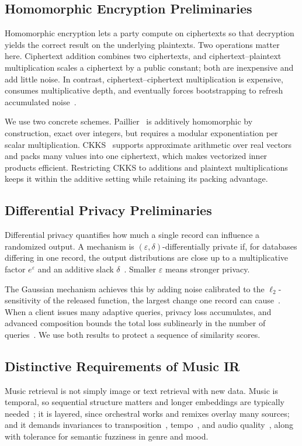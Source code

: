 \documentclass[sigconf,nonacm]{acmart}
\begin{document}
\subsection{Homomorphic Encryption Preliminaries}
Homomorphic encryption lets a party compute on ciphertexts so that decryption yields the correct result on the underlying plaintexts. Two operations matter here. Ciphertext addition combines two ciphertexts, and ciphertext--plaintext multiplication scales a ciphertext by a public constant; both are inexpensive and add little noise. In contrast, ciphertext--ciphertext multiplication is expensive, consumes multiplicative depth, and eventually forces bootstrapping to refresh accumulated noise~\cite{ckksboot2018}.

We use two concrete schemes. Paillier~\cite{paillier1999} is additively homomorphic by construction, exact over integers, but requires a modular exponentiation per scalar multiplication. CKKS~\cite{cheon2017homomorphic} supports approximate arithmetic over real vectors and packs many values into one ciphertext, which makes vectorized inner products efficient. Restricting CKKS to additions and plaintext multiplications keeps it within the additive setting while retaining its packing advantage.

\subsection{Differential Privacy Preliminaries}
Differential privacy quantifies how much a single record can influence a randomized output. A mechanism is $(\varepsilon,\delta)$-differentially private if, for databases differing in one record, the output distributions are close up to a multiplicative factor $e^{\varepsilon}$ and an additive slack $\delta$~\cite{dwork2006calibrating}. Smaller $\varepsilon$ means stronger privacy.

The Gaussian mechanism achieves this by adding noise calibrated to the $\ell_2$-sensitivity of the released function, the largest change one record can cause~\cite{dwork2014algorithmic}. When a client issues many adaptive queries, privacy loss accumulates, and advanced composition bounds the total loss sublinearly in the number of queries~\cite{dwork2010composition}. We use both results to protect a sequence of similarity scores.

\subsection{Distinctive Requirements of Music IR}
Music retrieval is not simply image or text retrieval with new data. Music is temporal, so sequential structure matters and longer embeddings are typically needed~\cite{ren2020pirhdy,yang2024multimodal}; it is layered, since orchestral works and remixes overlay many sources; and it demands invariances to transposition~\cite{mcallister2021cover}, tempo~\cite{ren2020pirhdy}, and audio quality~\cite{fremerey2013music}, along with tolerance for semantic fuzziness in genre and mood.
\end{document}
